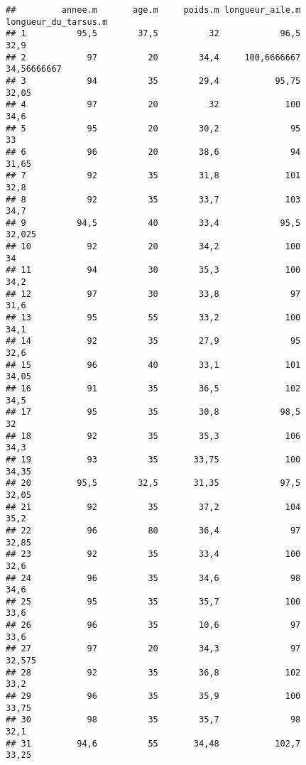 \documentclass[
]{article}
\begin{document}
\begin{verbatim}
##         annee.m       age.m     poids.m longueur_aile.m longueur_du_tarsus.m
## 1          95,5        37,5          32            96,5                 32,9
## 2            97          20        34,4     100,6666667          34,56666667
## 3            94          35        29,4           95,75                32,05
## 4            97          20          32             100                 34,6
## 5            95          20        30,2              95                   33
## 6            96          20        38,6              94                31,65
## 7            92          35        31,8             101                 32,8
## 8            92          35        33,7             103                 34,7
## 9          94,5          40        33,4            95,5               32,025
## 10           92          20        34,2             100                   34
## 11           94          30        35,3             100                 34,2
## 12           97          30        33,8              97                 31,6
## 13           95          55        33,2             100                 34,1
## 14           92          35        27,9              95                 32,6
## 15           96          40        33,1             101                34,05
## 16           91          35        36,5             102                 34,5
## 17           95          35        30,8            98,5                   32
## 18           92          35        35,3             106                 34,3
## 19           93          35       33,75             100                34,35
## 20         95,5        32,5       31,35            97,5                32,05
## 21           92          35        37,2             104                 35,2
## 22           96          80        36,4              97                32,85
## 23           92          35        33,4             100                 32,6
## 24           96          35        34,6              98                 34,6
## 25           95          35        35,7             100                 33,6
## 26           96          35        10,6              97                 33,6
## 27           97          20        34,3              97               32,575
## 28           92          35        36,8             102                 33,2
## 29           96          35        35,9             100                33,75
## 30           98          35        35,7              98                 32,1
## 31         94,6          55       34,48           102,7                33,25

\end{verbatim}
\end{document}
